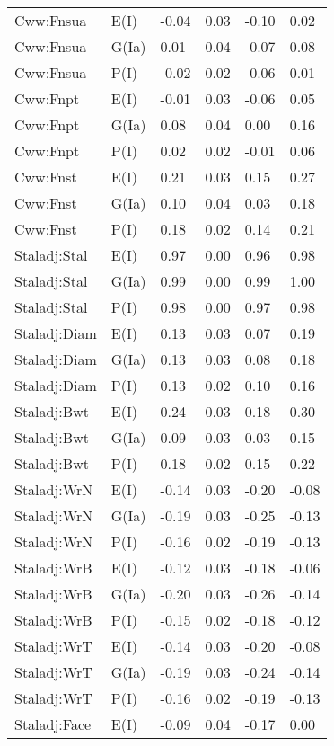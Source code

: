 \begin{center}
\begin{longtable}{|p{1.1in}|p{0.7in}|p{0.7in}|p{0.6in}|p{0.6in}|p{0.6in}|}
  Cww:Fnsua & E(I) & -0.04 & 0.03 & -0.10 & 0.02 \\ 
  Cww:Fnsua & G(Ia) & 0.01 & 0.04 & -0.07 & 0.08 \\ 
  Cww:Fnsua & P(I) & -0.02 & 0.02 & -0.06 & 0.01 \\ 
  Cww:Fnpt & E(I) & -0.01 & 0.03 & -0.06 & 0.05 \\ 
  Cww:Fnpt & G(Ia) & 0.08 & 0.04 & 0.00 & 0.16 \\ 
  Cww:Fnpt & P(I) & 0.02 & 0.02 & -0.01 & 0.06 \\ 
  Cww:Fnst & E(I) & 0.21 & 0.03 & 0.15 & 0.27 \\ 
  Cww:Fnst & G(Ia) & 0.10 & 0.04 & 0.03 & 0.18 \\ 
  Cww:Fnst & P(I) & 0.18 & 0.02 & 0.14 & 0.21 \\ 
  Staladj:Stal & E(I) & 0.97 & 0.00 & 0.96 & 0.98 \\ 
  Staladj:Stal & G(Ia) & 0.99 & 0.00 & 0.99 & 1.00 \\ 
  Staladj:Stal & P(I) & 0.98 & 0.00 & 0.97 & 0.98 \\ 
  Staladj:Diam & E(I) & 0.13 & 0.03 & 0.07 & 0.19 \\ 
  Staladj:Diam & G(Ia) & 0.13 & 0.03 & 0.08 & 0.18 \\ 
  Staladj:Diam & P(I) & 0.13 & 0.02 & 0.10 & 0.16 \\ 
  Staladj:Bwt & E(I) & 0.24 & 0.03 & 0.18 & 0.30 \\ 
  Staladj:Bwt & G(Ia) & 0.09 & 0.03 & 0.03 & 0.15 \\ 
  Staladj:Bwt & P(I) & 0.18 & 0.02 & 0.15 & 0.22 \\ 
  Staladj:WrN & E(I) & -0.14 & 0.03 & -0.20 & -0.08 \\ 
  Staladj:WrN & G(Ia) & -0.19 & 0.03 & -0.25 & -0.13 \\ 
  Staladj:WrN & P(I) & -0.16 & 0.02 & -0.19 & -0.13 \\ 
  Staladj:WrB & E(I) & -0.12 & 0.03 & -0.18 & -0.06 \\ 
  Staladj:WrB & G(Ia) & -0.20 & 0.03 & -0.26 & -0.14 \\ 
  Staladj:WrB & P(I) & -0.15 & 0.02 & -0.18 & -0.12 \\ 
  Staladj:WrT & E(I) & -0.14 & 0.03 & -0.20 & -0.08 \\ 
  Staladj:WrT & G(Ia) & -0.19 & 0.03 & -0.24 & -0.14 \\ 
  Staladj:WrT & P(I) & -0.16 & 0.02 & -0.19 & -0.13 \\ 
  Staladj:Face & E(I) & -0.09 & 0.04 & -0.17 & 0.00 \\ 

\end{longtable}
\end{center}
